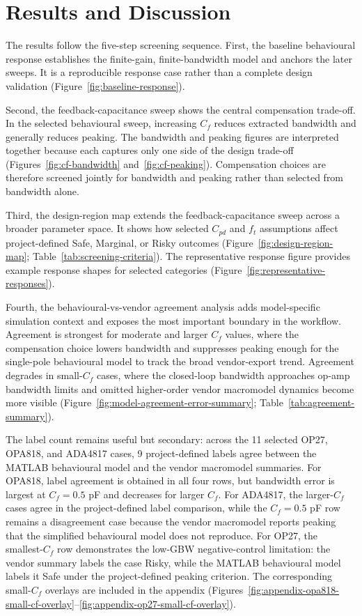 \section{Results and Discussion}

The results follow the five-step screening sequence. First, the baseline behavioural response establishes the finite-gain, finite-bandwidth model and anchors the later sweeps. It is a reproducible response case rather than a complete design validation (Figure~\ref{fig:baseline-response}).

Second, the feedback-capacitance sweep shows the central compensation trade-off. In the selected behavioural sweep, increasing $C_f$ reduces extracted bandwidth and generally reduces peaking. The bandwidth and peaking figures are interpreted together because each captures only one side of the design trade-off (Figures~\ref{fig:cf-bandwidth} and~\ref{fig:cf-peaking}). Compensation choices are therefore screened jointly for bandwidth and peaking rather than selected from bandwidth alone.

Third, the design-region map extends the feedback-capacitance sweep across a broader parameter space. It shows how selected $C_{pd}$ and $f_t$ assumptions affect project-defined Safe, Marginal, or Risky outcomes (Figure~\ref{fig:design-region-map}; Table~\ref{tab:screening-criteria}). The representative response figure provides example response shapes for selected categories (Figure~\ref{fig:representative-responses}).

Fourth, the behavioural-vs-vendor agreement analysis adds model-specific simulation context and exposes the most important boundary in the workflow. Agreement is strongest for moderate and larger $C_f$ values, where the compensation choice lowers bandwidth and suppresses peaking enough for the single-pole behavioural model to track the broad vendor-export trend. Agreement degrades in small-$C_f$ cases, where the closed-loop bandwidth approaches op-amp bandwidth limits and omitted higher-order vendor macromodel dynamics become more visible (Figure~\ref{fig:model-agreement-error-summary}; Table~\ref{tab:agreement-summary}).

The label count remains useful but secondary: across the 11 selected OP27, OPA818, and ADA4817 cases, 9 project-defined labels agree between the MATLAB behavioural model and the vendor macromodel summaries. For OPA818, label agreement is obtained in all four rows, but bandwidth error is largest at $C_f=0.5$ pF and decreases for larger $C_f$. For ADA4817, the larger-$C_f$ cases agree in the project-defined label comparison, while the $C_f=0.5$ pF row remains a disagreement case because the vendor macromodel reports peaking that the simplified behavioural model does not reproduce. For OP27, the smallest-$C_f$ row demonstrates the low-GBW negative-control limitation: the vendor summary labels the case Risky, while the MATLAB behavioural model labels it Safe under the project-defined peaking criterion. The corresponding small-$C_f$ overlays are included in the appendix (Figures~\ref{fig:appendix-opa818-small-cf-overlay}--\ref{fig:appendix-op27-small-cf-overlay}).

